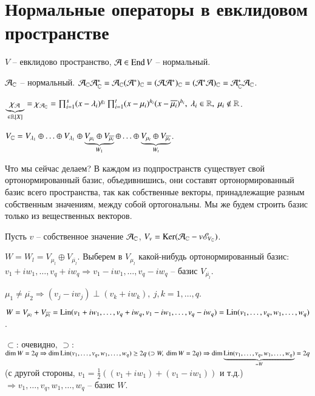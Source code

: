 \documentclass[main]{subfiles}
\begin{document}
\chapter{Нормальные операторы в евклидовом пространстве}

$V$ -- евклидово пространство, $\mathcal{A} \in \operatorname{End} V$ -- нормальный.

$\mathcal{A}_{\mathbb{C}}$ -- нормальный. $\mathcal{A}_{\mathbb{C}}\mathcal{A}_{\mathbb{C}}^* = \mathcal{A}_{\mathbb{C}}(\mathcal{A}^*)_{\mathbb{C}} = (\mathcal{A}\mathcal{A}^*)_{\mathbb{C}} = (\mathcal{A}^*\mathcal{A})_{\mathbb{C}} = \mathcal{A}_{\mathbb{C}}^*\mathcal{A}_{\mathbb{C}}$.

$\underbrace{\chi_{\mathcal{A}}}_{\in \mathbb{R}[X]} = \chi_{\mathcal{A}_{\mathbb{C}}} = \prod_{i=1}^s(x - \lambda_i)^{g_i} \prod_{i=1}^t(x - \mu_i)^{h_i} (x - \overline{\mu_i})^{h_i}, \ \lambda_i \in \mathbb{R}, \ \mu_i \not\in \mathbb{R}$.


$V_{\mathbb{C}} = V_{\lambda_1}\oplus\ldots\oplus V_{\lambda_1}\oplus \underbrace{V_{\mu_i}\oplus V_{\overline{\mu_i}}}_{W_1} \oplus \ldots \oplus\underbrace{V_{\mu_t} \oplus V_{\overline{\mu_t}}}_{W_t}$.

Что мы сейчас делаем? В каждом из подпространств существует свой ортонормированный базис, объедивнишись, они составят ортонормированный базис всего пространства, так как собственные векторы, принадлежащие 
разным собственным значениям, между собой ортогональны. Мы же будем строить базис только из вещественных векторов.

Пусть $v$ -- собственное значение $\mathcal{A}_{\mathbb{C}}$, $V_v = \operatorname{Ker} (\mathcal{A}_{\mathbb{C}} - v \mathscr{E}_{V_{\mathbb{C}}})$. 

$W = W_l = V_{\mu_l} \oplus V_{\overline{\mu_l}}$. Выберем в $V_{\mu_l}$ какой-нибудь ортонормированный базис: $v_1 + iw_1, \ldots, v_q + iw_q \Rightarrow
v_1 - iw_1, \ldots, v_q - iw_q$ -- базис $V_{\overline{\mu_l}}$.

$\mu_1 \neq \overline{\mu_2} \Rightarrow (v_j - iw_j) \perp (v_k + iw_k), \ j, k = 1, \ldots, q$.

$W = V_{\mu_l} + V_{\overline{\mu_l}} = \operatorname{Lin}(v_1 + iw_1, \ldots, v_q + iw_q, v_1 - iw_1, \ldots, v_q - iw_q) = \operatorname{Lin}(v_1, \ldots, v_q, w_1, \ldots, w_q)$. 

$\subset$: очевидно, $\supset$: $\dim W = 2q \Rightarrow \dim \operatorname{Lin} (v_1, \ldots, v_q, w_1, \ldots, w_q) \geq 2q \ (\supset W, \ \dim W = 2q) \Rightarrow
\dim \underbrace{\operatorname{Lin} (v_1, \ldots, v_q, w_1, \ldots, w_q)}_{=W} = 2q$ (с другой стороны, $v_1 = \frac{1}{2}((v_1 + iw_1) + (v_1 - iw_1))$ и т.д.) $\Rightarrow
v_1, \ldots, v_q, w_1, \ldots, w_q$ -- базис $W$.
\end{document}
